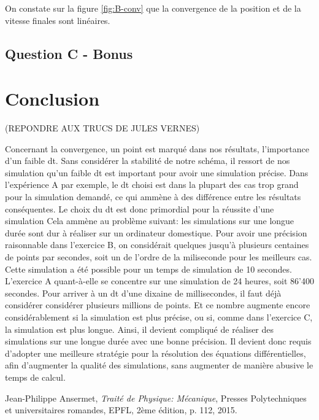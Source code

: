 \documentclass[a4paper,12pt,twoside]{article}
\begin{document}
On constate sur la figure \ref{fig:B-conv} que la convergence de la position et de la vitesse finales sont linéaires.

\subsection{Question C - Bonus}


\section{Conclusion}
(REPONDRE AUX TRUCS DE JULES VERNES)

Concernant la convergence, un point est marqué dans nos résultats, l'importance d'un faible dt.
Sans considérer la stabilité de notre schéma, il ressort de nos simulation qu'un faible dt est important pour avoir une simulation précise.
Dans l'expérience A par exemple, le dt choisi est dans la plupart des cas trop grand pour la simulation demandé, ce qui ammène à des différence entre les résultats conséquentes.
Le choix du dt est donc primordial pour la réussite d'une simulation
Cela ammène au problème suivant: les simulations sur une longue durée sont dur à réaliser sur un ordinateur domestique.
Pour avoir une précision raisonnable dans l'exercice B, on considérait quelques jusqu'à plusieurs centaines de points par secondes, soit un de l'ordre de la miliseconde pour les meilleurs cas.
Cette simulation a été possible pour un temps de simulation de 10 secondes.
L'exercice A quant-à-elle se concentre sur une simulation de 24 heures, soit 86'400 secondes.
Pour arriver à un dt d'une dixaine de millisecondes, il faut déjà considérer considérer plusieurs millions de points.
Et ce nombre augmente encore considérablement si la simulation est plus précise, ou si, comme dans l'exercice C, la simulation est plus longue.
Ainsi, il devient compliqué de réaliser des simulations sur une longue durée avec une bonne précision.
Il devient donc requis d'adopter une meilleure stratégie pour la résolution des équations différentielles, afin d'augmenter la qualité des simulations, sans augmenter de manière abusive le temps de calcul.


\begin{thebibliography}{99}

	Jean-Philippe Ansermet,
	\textit{Traité de Physique: Mécanique},
	Presses Polytechniques et universitaires romandes, EPFL,
	2ème édition,
	p. 112,
	2015.


\end{thebibliography}
\end{document}
